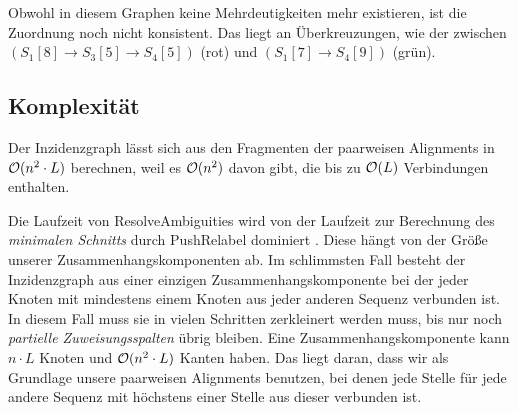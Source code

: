 \begin{center}
\end{center}

Obwohl in diesem Graphen keine Mehrdeutigkeiten mehr existieren, ist die Zuordnung noch nicht konsistent. Das liegt an Überkreuzungen, wie der zwischen $(S_1[8] \rightarrow S_3[5] \rightarrow S_4[5])$ (rot) und $(S_1[7] \rightarrow S_4[9])$ (grün). 

\subsection{Komplexität}\label{ch:ra_kompl}

Der Inzidenzgraph lässt sich aus den Fragmenten der paarweisen Alignments in $\mathcal{O}(n^2\cdot L)$ berechnen, weil es $\mathcal{O}(n^2)$ davon gibt, die bis zu $\mathcal{O}(L)$ Verbindungen enthalten.

Die Laufzeit von \textrm{ResolveAmbiguities} wird von der Laufzeit zur Berechnung des \emph{minimalen Schnitts} durch \textrm{PushRelabel} dominiert \citep{cpm10}. Diese hängt von der Größe unserer Zusammenhangskomponenten ab. Im schlimmsten Fall besteht der Inzidenzgraph aus einer einzigen Zusammenhangskomponente bei der jeder Knoten mit mindestens einem Knoten aus jeder anderen Sequenz verbunden ist. In diesem Fall muss sie in vielen Schritten zerkleinert werden muss, bis nur noch \emph{partielle Zuweisungsspalten} übrig bleiben. Eine Zusammenhangskomponente kann $n\cdot L$ Knoten und $\mathcal{O}(n^2\cdot L)$ Kanten haben. Das liegt daran, dass wir als Grundlage unsere paarweisen Alignments benutzen, bei denen jede Stelle für jede andere Sequenz mit höchstens einer Stelle aus dieser verbunden ist. 

